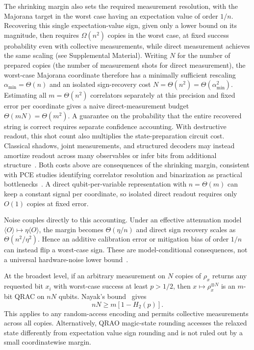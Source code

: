 \documentclass[10pt,aps,pra,twocolumn,superscriptaddress,nofootinbib,longbibliography]{revtex4-2}
\begin{document}
The shrinking margin also sets the required measurement resolution, with the Majorana target in the worst case having an expectation value of order $1/n$.  Recovering this single expectation-value sign, given only a lower bound on its magnitude, then requires $\Omega(n^2)$ copies in the worst case, at fixed success probability even with collective measurements, while direct measurement achieves the same scaling (see Supplemental Material).  Writing $N$ for the number of prepared copies (the number of measurement shots for direct measurement), the worst-case Majorana coordinate therefore has a minimally sufficient rescaling $\alpha_{\min}=\Theta(n)$ and an isolated sign-recovery cost $N=\Theta(n^2)=\Theta(\alpha_{\min}^2)$.  Estimating all $m=\Theta(n^2)$ correlators separately at this precision and fixed error per coordinate gives a naive direct-measurement budget $\Theta(mN)=\Theta(m^2)$.  A guarantee on the probability that the entire recovered string is correct requires separate confidence accounting.  With destructive readout, this shot count also multiplies the state-preparation circuit cost.  Classical shadows, joint measurements, and structured decoders may instead amortize readout across many observables or infer bits from additional structure~\cite{Huang2020ClassicalShadows,RaymondButsPistoia2025FewQubits,Wan2023MatchgateShadows,McNulty2025FermionicJoint}.  Both costs above are consequences of the shrinking margin, consistent with PCE studies identifying correlator resolution and binarization as practical bottlenecks~\cite{Sciorilli2025PCE,Padin2026ConstrainedPCE,Yoshioka2026LargeScalePCE,Sharma2026Hardware,LizzioBosco2026SimulablePCE}.  A direct qubit-per-variable representation with $n=\Theta(m)$ can keep a constant signal per coordinate, so isolated direct readout requires only $O(1)$ copies at fixed error.

Noise couples directly to this accounting.  Under an effective attenuation model $\langle O\rangle\mapsto\eta\langle O\rangle$, the margin becomes $\Theta(\eta/n)$ and direct sign recovery scales as $\Theta(n^2/\eta^2)$.  Hence an additive calibration error or mitigation bias of order $1/n$ can instead flip a worst-case sign.  These are model-conditional consequences, not a universal hardware-noise lower bound~\cite{Tamura2024NoiseQRAO,Sharma2026Hardware}.

At the broadest level, if an arbitrary measurement on $N$ copies of $\rho_x$ returns any requested bit $x_i$ with worst-case success at least $p>1/2$, then $x\mapsto\rho_x^{\otimes N}$ is an $m$-bit QRAC on $nN$ qubits.  Nayak's bound~\cite{Nayak1999QRAC} gives
\begin{equation}
    nN\ge m[1-H_2(p)].
    \label{eq:width-copies}
\end{equation}
This applies to any random-access encoding and permits collective measurements across all copies.  Alternatively, QRAO magic-state rounding accesses the relaxed state differently from expectation value sign rounding and is not ruled out by a small coordinatewise margin.
\end{document}
